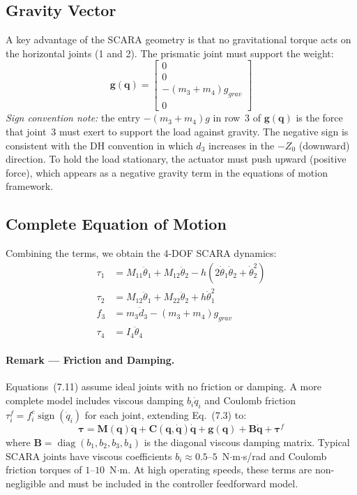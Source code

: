 \documentclass{article}
\begin{document}
\subsection{Gravity Vector}
A key advantage of the SCARA geometry is that no gravitational torque acts on the horizontal joints (1 and 2). The prismatic joint must support the weight:
\begin{equation}
\mathbf{g}(\mathbf{q}) = \begin{bmatrix}
0 \\
0 \\
-(m_3 + m_4)g_{grav} \\
0
\end{bmatrix} \tag{7.10}
\end{equation}
\textit{Sign convention note:} the entry $-(m_3+m_4)g$ in row~3 of $\mathbf{g}(\mathbf{q})$ is the force that joint~3 must exert to support the load against gravity. The negative sign is consistent with the DH convention in which $d_3$ increases in the $-Z_0$ (downward) direction. To hold the load stationary, the actuator must push upward (positive force), which appears as a negative gravity term in the equations of motion framework.

\subsection{Complete Equation of Motion}
Combining the terms, we obtain the 4-DOF SCARA dynamics:
\begin{align}
\tau_1 &= M_{11}\ddot{\theta}_1 + M_{12}\ddot{\theta}_2 - h(2\dot{\theta}_1\dot{\theta}_2 + \dot{\theta}_2^2) \nonumber \\
\tau_2 &= M_{12}\ddot{\theta}_1 + M_{22}\ddot{\theta}_2 + h\dot{\theta}_1^2 \nonumber \\
f_3 &= m_3\ddot{d}_3 - (m_3+m_4)g_{grav} \nonumber \\
\tau_4 &= I_4\ddot{\theta}_4 \tag{7.11}
\end{align}

\paragraph{Remark --- Friction and Damping.}
Equations~(7.11) assume ideal joints with no friction or damping. A more complete model includes viscous damping $b_i \dot{q}_i$ and Coulomb friction $\tau^f_i = f^c_i \operatorname{sign}(\dot{q}_i)$ for each joint, extending Eq.~(7.3) to:
\begin{equation}
\boldsymbol{\tau} = \mathbf{M}(\mathbf{q})\ddot{\mathbf{q}} + \mathbf{C}(\mathbf{q},\dot{\mathbf{q}})\dot{\mathbf{q}} + \mathbf{g}(\mathbf{q}) + \mathbf{B}\dot{\mathbf{q}} + \boldsymbol{\tau}^f \tag{7.12}
\end{equation}
where $\mathbf{B} = \operatorname{diag}(b_1,b_2,b_3,b_4)$ is the diagonal viscous damping matrix. Typical SCARA joints have viscous coefficients $b_i \approx 0.5$--$5$~N$\cdot$m$\cdot$s/rad and Coulomb friction torques of $1$--$10$~N$\cdot$m. At high operating speeds, these terms are non-negligible and must be included in the controller feedforward model.
\end{document}
